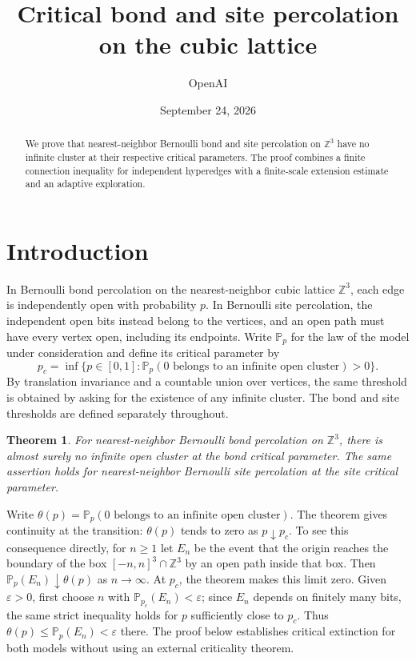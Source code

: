\documentclass[11pt]{article}
\title{Critical bond and site percolation on the cubic lattice}
\author{OpenAI}
\date{September 24, 2026}
\newtheorem{theorem}{Theorem}[section]
\theoremstyle{definition}
\theoremstyle{remark}
\numberwithin{equation}{section}
\begin{document}
\begin{abstract}
We prove that nearest-neighbor Bernoulli bond and site percolation on
$\mathbb Z^3$ have no infinite cluster at their respective critical parameters.
The proof combines a finite connection inequality for independent hyperedges
with a finite-scale extension estimate and an adaptive exploration.
\end{abstract}
\section{Introduction}

In Bernoulli bond percolation on the nearest-neighbor cubic lattice
$\mathbb Z^3$, each edge is independently open with probability $p$.
In Bernoulli site percolation, the independent open bits instead belong to
the vertices, and an open path must have every vertex open, including its
endpoints. Write $\mathbb P_p$ for the law of the model under consideration
and define its critical parameter by
\[
 p_c=\inf\{p\in[0,1]:
       \mathbb P_p(0\text{ belongs to an infinite open cluster})>0\}.
\]
By translation invariance and a countable union over vertices, the same
threshold is obtained by asking for the existence of any infinite cluster.
The bond and site thresholds are defined separately throughout.

\begin{theorem}\label{thm:main}
For nearest-neighbor Bernoulli bond percolation on $\mathbb Z^3$, there is
almost surely no infinite open cluster at the bond critical parameter.
The same assertion holds for nearest-neighbor Bernoulli site percolation
at the site critical parameter.
\end{theorem}

Write $\theta(p)=\mathbb P_p(0\text{ belongs to an infinite open cluster})$.
The theorem gives continuity at the transition: $\theta(p)$ tends to
zero as $p\downarrow p_c$. To see this consequence directly, for $n\ge1$ let $E_n$ be
the event that the origin reaches the boundary of the box
$[-n,n]^3\cap\mathbb Z^3$ by an open path inside that box. Then
$\mathbb P_p(E_n)\downarrow\theta(p)$ as $n\to\infty$. At $p_c$, the
theorem makes this limit zero. Given $\varepsilon>0$, first choose $n$
with $\mathbb P_{p_c}(E_n)<\varepsilon$; since $E_n$ depends on finitely
many bits, the same strict inequality holds for $p$ sufficiently close
to $p_c$. Thus $\theta(p)\le\mathbb P_p(E_n)<\varepsilon$ there.
The proof below establishes critical extinction for both models without
using an external criticality theorem.
\end{document}
